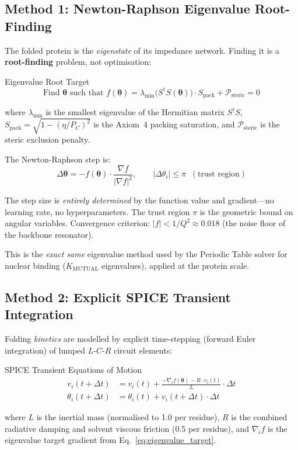 \subsection{Method 1: Newton-Raphson Eigenvalue Root-Finding}
\label{sec:eigenvalue_solver}

The folded protein is the \emph{eigenstate} of its impedance network.  Finding it is a \textbf{root-finding} problem, not optimisation:
\begin{resultbox}{Eigenvalue Root Target}
\begin{equation}
    \text{Find } \boldsymbol{\theta} \text{ such that } f(\boldsymbol{\theta}) = \lambda_{\min}\bigl(S^\dagger S(\boldsymbol{\theta})\bigr) \cdot S_\text{pack} + \mathcal{P}_\text{steric} = 0
    \label{eq:eigenvalue_target}
\end{equation}
\end{resultbox}
where $\lambda_{\min}$ is the smallest eigenvalue of the Hermitian matrix $S^\dagger S$, $S_\text{pack} = \sqrt{1 - (\eta/P_C)^2}$ is the Axiom~4 packing saturation, and $\mathcal{P}_\text{steric}$ is the steric exclusion penalty.

The Newton-Raphson step is:
\begin{equation}
    \Delta\boldsymbol{\theta} = -f(\boldsymbol{\theta}) \cdot \frac{\nabla f}{|\nabla f|^2}, \qquad |\Delta\theta_i| \leq \pi \;\;(\text{trust region})
    \label{eq:newton_step}
\end{equation}

The step size is \emph{entirely determined} by the function value and gradient---no learning rate, no hyperparameters.  The trust region $\pi$ is the geometric bound on angular variables.  Convergence criterion: $|f| < 1/Q^2 \approx 0.018$ (the noise floor of the backbone resonator).

This is the \emph{exact same} eigenvalue method used by the Periodic Table solver for nuclear binding ($K_{\text{MUTUAL}}$ eigenvalues), applied at the protein scale.

\subsection{Method 2: Explicit SPICE Transient Integration}
\label{sec:spice_transient_solver}

Folding \emph{kinetics} are modelled by explicit time-stepping (forward Euler integration) of lumped $L$-$C$-$R$ circuit elements:
\begin{resultbox}{SPICE Transient Equations of Motion}
\begin{align}
    v_i(t + \Delta t) &= v_i(t) + \frac{-\nabla_i f(\boldsymbol{\theta}) - R \cdot v_i(t)}{L} \cdot \Delta t \label{eq:spice_velocity} \\
    \theta_i(t + \Delta t) &= \theta_i(t) + v_i(t + \Delta t) \cdot \Delta t \label{eq:spice_position}
\end{align}
\end{resultbox}
where $L$ is the inertial mass (normalised to 1.0 per residue), $R$ is the combined radiative damping and solvent viscous friction (0.5 per residue), and $\nabla_i f$ is the eigenvalue target gradient from Eq.~\ref{eq:eigenvalue_target}.


